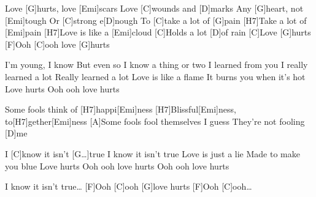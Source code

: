 
\sloka
Love [G]hurts, love [Emi]scars
Love [C]wounds and [D]marks
Any [G]heart, not [Emi]tough
Or [C]strong e[D]nough
To [C]take a lot of [G]pain
[H7]Take a lot of [Emi]pain
[H7]Love is like a [Emi]cloud
[C]Holds a lot [D]of rain
[C]Love [G]hurts
[F]Ooh [C]ooh love [G]hurts

\sloka
I’m young, I know
But even so
I know a thing or two
I learned from you
I really learned a lot
Really learned a lot
Love is like a flame
It burns you when it’s hot
Love hurts
Ooh ooh love hurts

\hvezda
[Emi]Some fools think of [H7]happi[Emi]ness
[H7]Blissful[Emi]ness, to[H7]gether[Emi]ness
[A]Some fools fool themselves I guess
They’re not fooling [D]me

\sloka
I [C]know it isn’t [G…]true
I know it isn’t true
Love is just a lie
Made to make you blue
Love hurts
Ooh ooh love hurts
Ooh ooh love hurts

\sloka
[*Mezihra]
I know it isn’t true…
[F]Ooh [C]ooh [G]love hurts
[F]Ooh [C]ooh…
